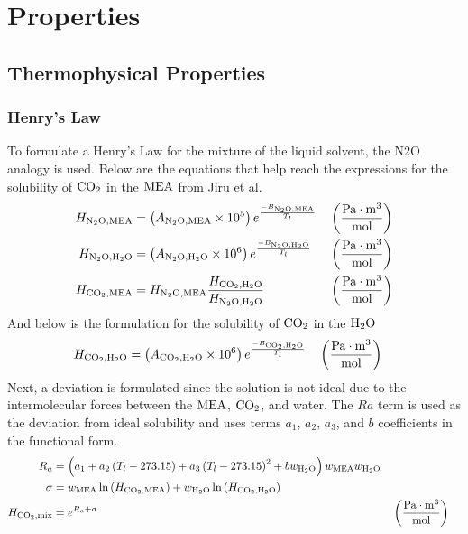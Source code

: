 \documentclass[a4paper,fleqn]{cas-sc}
\newcommand{\COtwo}{{\ce{CO2}}}
\newcommand{\HtwoO}{{\ce{H2O}}}
\newcommand{\MEA}{{\ce{MEA}}}
\newcommand{\NtwoO}{{\ce{N2O}}}
\begin{document}
    \clearpage
    \appendix
    \vspace{1cm}
    \section{Properties}\label{sec:properties}
    \vspace{1cm}
    \subsection{Thermophysical Properties}
    \vspace{1cm}
    \subsubsection{Henry's Law}
    To formulate a Henry's Law for the mixture of the liquid solvent, the N2O analogy is used. Below are the equations that help reach the expressions for the solubility of $\COtwo$ in the $\MEA$ from Jiru et al. \cite{Jiru2012}
    \begin{align}
        H_{\NtwoO,\MEA} &= \left(A_{\NtwoO,\MEA} \times 10^5\right) e^{\frac{-B_{\NtwoO,\MEA}}{T_l}} && \left(\frac{\unit{Pa} \cdot \unit{m}^3}{\unit{mol}} \right)\\
        H_{\NtwoO,\HtwoO} &= \left(A_{\NtwoO,\HtwoO} \times 10^6\right) e^{\frac{-B_{\NtwoO,\HtwoO}}{T_l}} && \left(\frac{\unit{Pa} \cdot \unit{m}^3}{\unit{mol}} \right)\\
        H_{\COtwo,\MEA} &= H_{\NtwoO,\MEA} \frac{H_{\COtwo, \HtwoO}}{H_{\NtwoO,\HtwoO}} && \left(\frac{\unit{Pa} \cdot \unit{m}^3}{\unit{mol}} \right)
    \end{align}
    And below is the formulation for the solubility of $\COtwo$ in the $\HtwoO$
    \begin{align}
        H_{\COtwo, \HtwoO} &= \left(A_{\COtwo, \HtwoO} \times 10^6\right) e^{\frac{-B_{\COtwo, \HtwoO}}{T_l}} && \left(\frac{\unit{Pa} \cdot \unit{m}^3}{\unit{mol}} \right)
    \end{align}
    Next, a deviation is formulated since the solution is not ideal due to the intermolecular forces between the $\MEA$, $\COtwo$, and water. The $Ra$ term is used as the deviation from ideal solubility and uses terms $a_1$, $a_2$, $a_3$, and $b$ coefficients in the functional form.
    \begin{align}
        R_{a} &= \left(a_1+a_2 \left(T_l-273.15\right)+a_3 \left(T_l-273.15\right)^2+b w_{\HtwoO}\right) w_{\MEA} w_{\HtwoO} \\
        \sigma &= w_{\MEA} \ln\left(H_{\COtwo,\MEA}\right)+w_{\HtwoO} \ln\left(H_{\COtwo,\HtwoO}\right) \\
        H_{\COtwo,\text{mix}} &= e^{R_{a} + \sigma} && \left(\frac{\unit{Pa} \cdot \unit{m}^3}{\unit{mol}} \right)
    \end{align}
\end{document}
